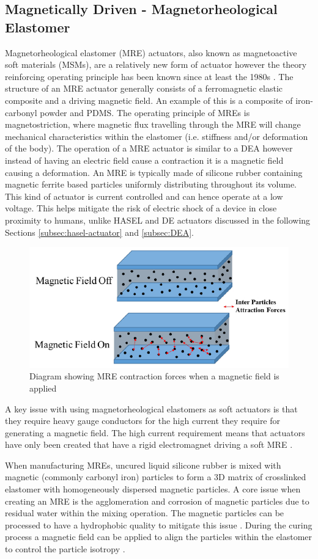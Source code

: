 \subsection{Magnetically Driven - Magnetorheological Elastomer}
Magnetorheological elastomer (MRE) actuators, also known as magnetoactive soft materials (MSMs), are a relatively new form of actuator however the theory reinforcing operating principle has been known since at least the 1980s \citep{Jolly1996}. The structure of an MRE actuator generally consists of a ferromagnetic elastic composite and a driving magnetic field. An example of this is a composite of iron-carbonyl powder and PDMS. The operating principle of MREs is magnetostriction, where magnetic flux travelling through the MRE will change mechanical characteristics within the elastomer (i.e. stiffness and/or deformation of the body). The operation of a MRE actuator is similar to a DEA however instead of having an electric field cause a contraction it is a magnetic field causing a deformation. An MRE is typically made of silicone rubber containing magnetic ferrite based particles uniformly distributing throughout its volume. This kind of actuator is current controlled and can hence operate at a low voltage. This helps mitigate the risk of electric shock of a device in close proximity to humans, unlike HASEL and DE actuators discussed in the following Sections \ref{subsec:hasel-actuator} and \ref{subsec:DEA}.
\begin{figure}[H]
  \centering
  \includegraphics[width=0.6\linewidth]{Figures/MRE_actuate.jpg} %
  \caption{Diagram showing MRE contraction forces when a magnetic field is applied \citep{Park2018a}}
  \label{fig:Artificial Muscle_MRE}
\end{figure}
A key issue with using magnetorheological elastomers as soft actuators is that they require heavy gauge conductors for the high current they require for generating a magnetic field. The high current requirement means that actuators have only been created that have a rigid electromagnet driving a soft MRE \citep{Bose2012}. 

When manufacturing MREs, uncured liquid silicone rubber is mixed with magnetic (commonly carbonyl iron) particles to form a 3D matrix of crosslinked elastomer with homogeneously dispersed magnetic particles. A core issue when creating an MRE is the agglomeration and corrosion of magnetic particles due to residual water within the mixing operation. The magnetic particles can be processed to have a hydrophobic quality to mitigate this issue \cite{Burhannuddin2020,Ge2020}. During the curing process a magnetic field can be applied to align the particles within the elastomer to control the particle isotropy \cite{Ge2020,LaleganiDezaki2023}.

